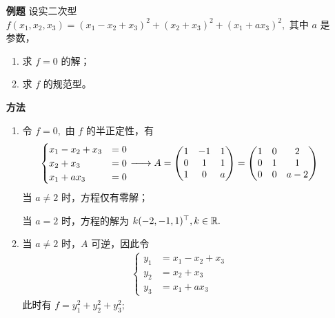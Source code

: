 \begin{itemize}
    \item[\textbf{例题}] 设实二次型 $ f(x_1,x_2,x_3) = (x_1 - x_2 + x_3)^2+(x_2 + x_3)^2+(x_1 + ax_3)^2, $ 
    其中 $ a $ 是参数，
    \begin{enumerate}[label = \Roman*.]
        \item 求 $ f = 0 $ 的解；
        \item 求 $ f $ 的规范型。
    \end{enumerate}
    \item[\textbf{方法}]
    \begin{enumerate}[label = \Roman*.]
        \item 令 $ f = 0, $ 由 $ f $ 的半正定性，有
        \begin{equation*}
            \begin{aligned}
                \begin{cases}
                    x_1-x_2+x_3 &= 0\\
                    x_2+x_3 &= 0\\
                    x_1+ax_3 &= 0\\
                \end{cases} \xlongrightarrow{~~~~}
                A = \begin{pmatrix}
                    1&-1&1\\0&1&1\\1&0&a\\
                \end{pmatrix}
                = \begin{pmatrix}
                    1&0&2\\0&1&1\\0&0&a-2\\
                \end{pmatrix}
            \end{aligned}
        \end{equation*}
        当 $ a \neq 2 $ 时，方程仅有零解；
        
        当 $ a = 2 $ 时，方程的解为 $ k(-2,-1,1)^\top, k\in \mathbb R. $ 
        \item 当 $ a \neq 2 $ 时，$ A $ 可逆，因此令
        \begin{equation*}
            \begin{aligned}
                \begin{cases}
                    y_1 &= x_1-x_2+x_3\\
                    y_2 &= x_2+x_3\\
                    y_3 &= x_1+ax_3
                \end{cases}
            \end{aligned}
        \end{equation*}
        此时有 $ f = y_1^2 + y^2_2 + y^2_3; $  


\end{enumerate}
\end{itemize}
